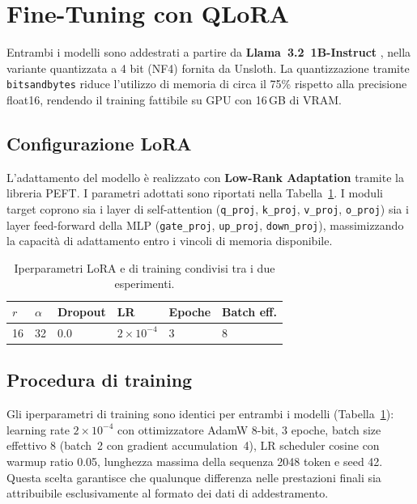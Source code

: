 \section{Fine-Tuning con QLoRA}
\label{sec:step2}

Entrambi i modelli sono addestrati a partire da
\textbf{Llama~3.2~1B-Instruct} \cite{meta2024llama32}, nella variante
quantizzata a 4 bit (NF4) fornita da Unsloth. La quantizzazione tramite
\texttt{bitsandbytes} riduce l'utilizzo di memoria di circa il 75\%
rispetto alla precisione float16, rendendo il training fattibile su
GPU con 16\,GB di VRAM.

\subsection{Configurazione LoRA}

L'adattamento del modello è realizzato con \textbf{Low-Rank
Adaptation} \cite{hu2021lora} tramite la libreria PEFT. I parametri
adottati sono riportati nella Tabella~\ref{tab:lora}. I moduli target
coprono sia i layer di self-attention (\texttt{q\_proj},
\texttt{k\_proj}, \texttt{v\_proj}, \texttt{o\_proj}) sia i layer
feed-forward della MLP (\texttt{gate\_proj}, \texttt{up\_proj},
\texttt{down\_proj}), massimizzando la capacità di adattamento entro
i vincoli di memoria disponibile.

\begin{table}[t]
  \centering
  \caption{Iperparametri LoRA e di training condivisi tra i due esperimenti.}
  \label{tab:lora}
  \small
  \renewcommand{\arraystretch}{1.3}
  \begin{tabular}{l l l l l l}
    \toprule
    $r$ & $\alpha$ & Dropout & LR & Epoche & Batch eff. \\
    \midrule
    16 & 32 & 0.0 & $2{\times}10^{-4}$ & 3 & 8 \\
    \bottomrule
  \end{tabular}
\end{table}

\subsection{Procedura di training}

Gli iperparametri di training sono identici per entrambi i modelli
(Tabella~\ref{tab:lora}): learning rate $2 \times 10^{-4}$ con
ottimizzatore AdamW 8-bit, 3 epoche, batch size effettivo 8
(batch~2 con gradient accumulation~4), LR scheduler cosine con
warmup ratio 0.05, lunghezza massima della sequenza 2048 token e
seed 42. Questa scelta garantisce che qualunque differenza nelle
prestazioni finali sia attribuibile esclusivamente al formato dei
dati di addestramento.

